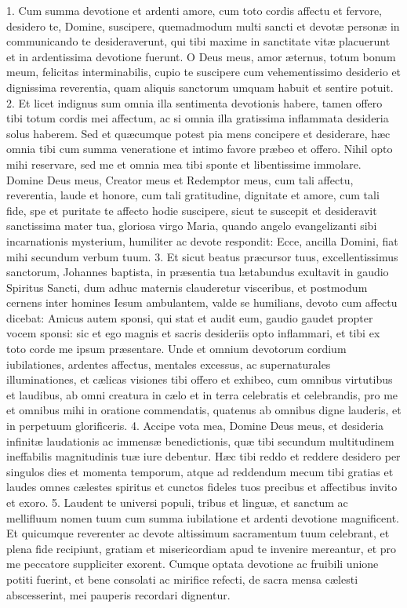 1. Cum summa devotione et ardenti amore, cum toto cordis affectu et fervore, desidero te, Domine, suscipere, quemadmodum multi sancti et devotæ personæ in communicando te desideraverunt, qui tibi maxime in sanctitate vitæ placuerunt et in ardentissima devotione fuerunt. O Deus meus, amor æternus, totum bonum meum, felicitas interminabilis, cupio te suscipere cum vehementissimo desiderio et dignissima reverentia, quam aliquis sanctorum umquam habuit et sentire potuit.
2. Et licet indignus sum omnia illa sentimenta devotionis habere, tamen offero tibi totum cordis mei affectum, ac si omnia illa gratissima inflammata desideria solus haberem. Sed et quæcumque potest pia mens concipere et desiderare, hæc omnia tibi cum summa veneratione et intimo favore præbeo et offero. Nihil opto mihi reservare, sed me et omnia mea tibi sponte et libentissime immolare. Domine Deus meus, Creator meus et Redemptor meus, cum tali affectu, reverentia, laude et honore, cum tali gratitudine, dignitate et amore, cum tali fide, spe et puritate te affecto hodie suscipere, sicut te suscepit et desideravit sanctissima mater tua, gloriosa virgo Maria, quando angelo evangelizanti sibi incarnationis mysterium, humiliter ac devote respondit: Ecce, ancilla Domini, fiat mihi secundum verbum tuum.
3. Et sicut beatus præcursor tuus, excellentissimus sanctorum, Johannes baptista, in præsentia tua lætabundus exultavit in gaudio Spiritus Sancti, dum adhuc maternis clauderetur visceribus, et postmodum cernens inter homines Iesum ambulantem, valde se humilians, devoto cum affectu dicebat: Amicus autem sponsi, qui stat et audit eum, gaudio gaudet propter vocem sponsi: sic et ego magnis et sacris desideriis opto inflammari, et tibi ex toto corde me ipsum præsentare. Unde et omnium devotorum cordium iubilationes, ardentes affectus, mentales excessus, ac supernaturales illuminationes, et cælicas visiones tibi offero et exhibeo, cum omnibus virtutibus et laudibus, ab omni creatura in cælo et in terra celebratis et celebrandis, pro me et omnibus mihi in oratione commendatis, quatenus ab omnibus digne lauderis, et in perpetuum glorificeris.
4. Accipe vota mea, Domine Deus meus, et desideria infinitæ laudationis ac immensæ benedictionis, quæ tibi secundum multitudinem ineffabilis magnitudinis tuæ iure debentur. Hæc tibi reddo et reddere desidero per singulos dies et momenta temporum, atque ad reddendum mecum tibi gratias et laudes omnes cælestes spiritus et cunctos fideles tuos precibus et affectibus invito et exoro.
5. Laudent te universi populi, tribus et linguæ, et sanctum ac mellifluum nomen tuum cum summa iubilatione et ardenti devotione magnificent. Et quicumque reverenter ac devote altissimum sacramentum tuum celebrant, et plena fide recipiunt, gratiam et misericordiam apud te invenire mereantur, et pro me peccatore suppliciter exorent. Cumque optata devotione ac fruibili unione potiti fuerint, et bene consolati ac mirifice refecti, de sacra mensa cælesti abscesserint, mei pauperis recordari dignentur.


